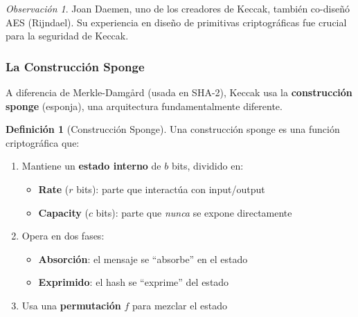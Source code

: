 \documentclass[11pt,a4paper,twoside,openright]{book}
\theoremstyle{definition}
\newtheorem{definition}{Definición}[chapter]
\theoremstyle{plain}
\theoremstyle{remark}
\newtheorem{remark}{Observación}[chapter]
\begin{document}
\begin{remark}
Joan Daemen, uno de los creadores de Keccak, también co-diseñó AES (Rijndael). Su experiencia en diseño de primitivas criptográficas fue crucial para la seguridad de Keccak.
\end{remark}

\subsubsection{La Construcción Sponge}

A diferencia de Merkle-Damgård (usada en SHA-2), Keccak usa la \textbf{construcción sponge} (esponja), una arquitectura fundamentalmente diferente.

\begin{definition}[Construcción Sponge]
Una construcción sponge es una función criptográfica que:
\begin{enumerate}
    \item Mantiene un \textbf{estado interno} de $b$ bits, dividido en:
    \begin{itemize}
        \item \textbf{Rate} ($r$ bits): parte que interactúa con input/output
        \item \textbf{Capacity} ($c$ bits): parte que \textit{nunca} se expone directamente
    \end{itemize}
    \item Opera en dos fases:
    \begin{itemize}
        \item \textbf{Absorción}: el mensaje se ``absorbe'' en el estado
        \item \textbf{Exprimido}: el hash se ``exprime'' del estado
    \end{itemize}
    \item Usa una \textbf{permutación} $f$ para mezclar el estado
\end{enumerate}
\end{definition}
\end{document}
